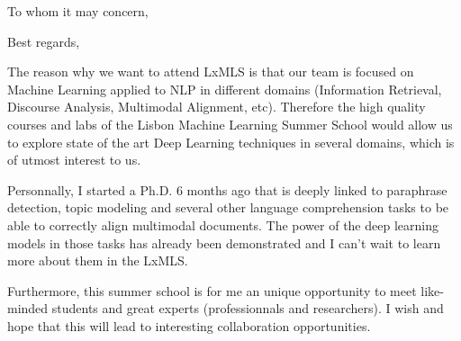 \documentclass[11pt,a4paper,sans]{moderncv}        %
\begin{document}

\clearpage
\date{April 8, 2015}
\opening{To whom it may concern,}
\closing{Best regards,}
\makelettertitle

The reason why we want to attend LxMLS is that our team is focused on
Machine Learning applied to NLP in different domains (Information
Retrieval, Discourse Analysis, Multimodal Alignment, etc). Therefore
the high quality courses and labs of the Lisbon Machine Learning
Summer School would allow us to explore state of the art Deep Learning
techniques in several domains, which is of utmost interest to us.

Personnally, I started a Ph.D. 6 months ago that is deeply linked to
paraphrase detection, topic modeling and several other language
comprehension tasks to be able to correctly align multimodal
documents. The power of the deep learning models in those tasks has
already been demonstrated and I can't wait to learn more about them in
the LxMLS.

Furthermore, this summer school is for me an unique opportunity to
meet like-minded students and great experts (professionnals and
researchers). I wish and hope that this will lead to interesting
collaboration opportunities.

\makeletterclosing

\end{document}
